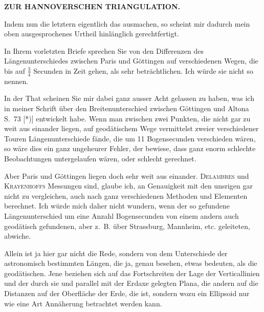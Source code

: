 \par\clearpage
\noindent\null\hfill{\small\textbf{ZUR HANNOVERSCHEN TRIANGULATION.}}\hfill{}\par\medskip
\par\noindent\hspace*{\parindent}Indem nun die letztern eigentlich das  ausmachen, so scheint mir dadurch mein oben ausgesprochenes Urtheil hinlänglich gerechtfertigt.
\par\noindent\hspace*{\parindent}In Ihrem vorletzten Briefe sprechen Sie von den Differenzen des Längenunterschiedes zwischen Paris und Göttingen auf verschiedenen Wegen, die bis auf \(\frac{3}{4}\) Secunden in Zeit gehen, als sehr beträchtlichen. Ich würde sie nicht so nennen.
\par\noindent\hspace*{\parindent}In der That scheinen Sie mir dabei ganz ausser Acht gelassen zu haben, was ich in meiner Schrift über den Breitenunterschied zwischen Göttingen und Altona S.~73 [*)] entwickelt habe. Wenn man zwischen zwei Punkten, die nicht gar zu weit aus einander liegen, auf geodätischem Wege vermittelst zweier verschiedener Touren Längenunterschiede fände, die um 11 Bogensecunden verschieden wären, so wäre dies ein ganz ungeheurer Fehler, der bewiese, dass ganz enorm schlechte Beobachtungen untergelaufen wären, oder schlecht gerechnet.
\par\noindent\hspace*{\parindent}Aber Paris und Göttingen liegen doch sehr weit aus einander. \textsc{Delambres} und \textsc{Krayenhoffs} Messungen sind, glaube ich, an Genauigkeit mit den unsrigen gar nicht zu vergleichen, auch nach ganz verschiedenen Methoden und Elementen berechnet. Ich würde mich daher nicht wundern, wenn der so gefundene Längenunterschied um eine Anzahl Bogensecunden von einem andern auch geodätisch gefundenen, aber z.~B. über Strassburg, Mannheim, etc. geleiteten, abwiche.
\par\noindent\hspace*{\parindent}Allein  ist ja hier gar nicht die Rede, sondern von dem Unterschiede der astronomisch bestimmten Längen, die ja, genau besehen, etwas  bedeuten, als die geodätischen. Jene beziehen sich auf das Fortschreiten der Lage der Verticallinien und der durch sie und parallel mit der Erdaxe gelegten Plana, die andern auf die Distanzen auf der Oberfläche der Erde, die  ist, sondern wozu ein Ellipsoid nur wie eine Art Annäherung betrachtet werden kann.
